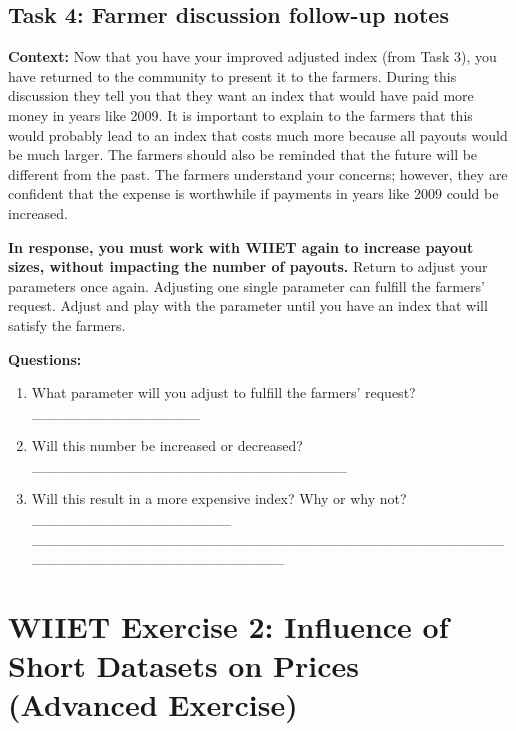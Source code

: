 \documentclass[letterpaper,10pt,english]{sphinxmanual}
\begin{document}
\subsection{Task 4: Farmer discussion follow-up notes}
\label{wiiet/wiiet_usingfarmerinformation_Web:task-4-farmer-discussion-follow-up-notes}
\textbf{Context:} Now that you have your improved adjusted index (from Task 3), you have returned to the community to present it to the farmers. During this discussion they tell you that they want an index that would have paid more money in years like 2009. It is important to explain to the farmers that this would probably lead to an index that costs much more because all payouts would be much larger. The farmers should also be reminded that the future will be different from the past. The farmers understand your concerns; however, they are confident that the expense is worthwhile if payments in years like 2009 could be increased.

\textbf{In response, you must work with WIIET again to increase payout sizes, without impacting the number of payouts.} Return to adjust your parameters once again. Adjusting one single parameter can fulfill the farmers' request. Adjust and play with the parameter until you have an index that will satisfy the farmers.

\textbf{Questions:}
\begin{enumerate}
\item {} 
What parameter will you adjust to fulfill the farmers' request? \_\_\_\_\_\_\_\_\_\_\_\_\_\_\_\_

\item {} 
Will this number be increased or decreased? \_\_\_\_\_\_\_\_\_\_\_\_\_\_\_\_\_\_\_\_\_\_\_\_\_\_\_\_\_\_

\item {} 
Will this result in a more expensive index? Why or why not? \_\_\_\_\_\_\_\_\_\_\_\_\_\_\_\_\_\_\_ \_\_\_\_\_\_\_\_\_\_\_\_\_\_\_\_\_\_\_\_\_\_\_\_\_\_\_\_\_\_\_\_\_\_\_\_\_\_\_\_\_\_\_\_\_\_\_\_\_\_\_\_\_\_\_\_\_\_\_\_\_\_\_\_\_\_\_\_\_

\end{enumerate}


\section{WIIET Exercise 2: Influence of Short Datasets on Prices (Advanced Exercise)}
\label{wiiet/wiiet_influenceshortdatasets_Web::doc}\label{wiiet/wiiet_influenceshortdatasets_Web:wiiet-exercise-2-influence-of-short-datasets-on-prices-advanced-exercise}
\end{document}
